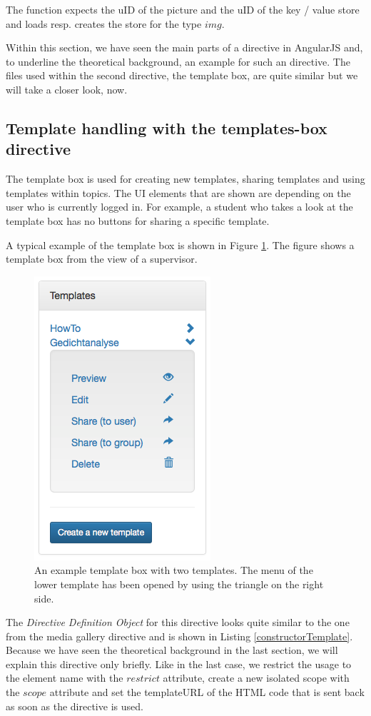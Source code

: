 The function expects the uID of the picture and the uID of the key / value store and loads resp. creates the store for the type $img$.

Within this section, we have seen the main parts of a directive in AngularJS and, to underline the theoretical background, an example for such an directive.
The files used within the second directive, the template box, are quite similar but we will take a closer look, now.

\subsection{Template handling with the templates-box directive}
The template box is used for creating new templates, sharing templates and using templates within topics. The \ac{UI} elements that are shown are depending on the user who is currently logged in. For example, a student who takes a look at the template box has no buttons for sharing a specific template.

A typical example of the template box is shown in Figure \ref{templateBox}. The figure shows a template box from the view of a supervisor.

\begin{figure}[th]
\centerline{\includegraphics[width=.4\textwidth]{gfx/templateBox}}
\caption{An example template box with two templates. The menu of the lower template has been opened by using the triangle on the right side.}
\label{templateBox}
\end{figure}

The \emph{Directive Definition Object} for this directive looks quite similar to the one from the media gallery directive and is shown in Listing \ref{constructorTemplate}. Because we have seen the theoretical background in the last section, we will explain this directive only briefly. Like in the last case, we restrict the usage to the element name with the $restrict$ attribute, create a new isolated scope with the $scope$ attribute and set the templateURL of the \ac{HTML} code that is sent back as soon as the directive is used. 

